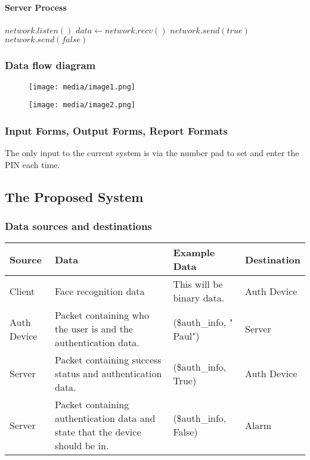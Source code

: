 \documentclass[12pt,a4paper]{report}
\begin{document}
\paragraph{Server Process}

\begin{algorithmic}
	\STATE $network.listen()$ 
	\STATE $data\gets network.recv()$ 
			\STATE $network.send(true)$ 
		\ELSE
			\STATE $network.send(false)$ 
		\ENDIF
	\ENDIF
\ENDWHILE

\end{algorithmic}

\subsubsection{Data flow diagram}\label{section:_Toc370402500}
\begin{figure}[H]

\texttt{[image: media/image1.png]}
\end{figure}


\begin{figure}[H]

\texttt{[image: media/image2.png]}
\end{figure}


\subsubsection{Input Forms, Output Forms, Report 
Formats}\label{section:_Toc370402501}
The only input to the current system is via the number pad to set and 
enter the PIN each time.

\subsection{The Proposed System}\label{section:_Toc370402502}
\subsubsection{Data sources and destinations}\label{section:_Toc370402503}

\begin{tabular}{|l|p{4.5cm}|l|l|}
\hline
\textbf{Source} & \textbf{Data} & \textbf{Example Data} & \textbf{
Destination} \\
\hline
Client & Face recognition data & This will be binary data. & Auth Device 
\\
\hline
Auth Device & Packet containing who the user is and the authentication 
data. & (\$auth\_info, "\,Paul") & Server \\
\hline
Server & Packet containing success status and authentication data. & 
(\$auth\_info, True) & Auth Device \\
\hline
Server & Packet containing authentication data and state that the device 
should be in. & (\$auth\_info, False) & Alarm \\
\hline
\end{tabular}
\end{document}
